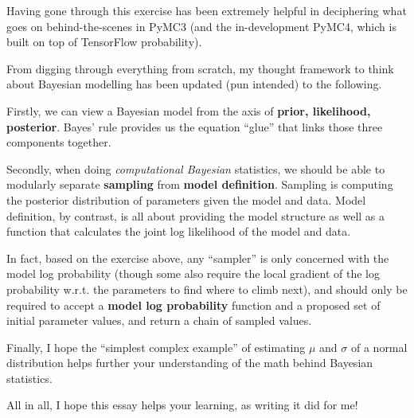 Having gone through this exercise has been extremely helpful in deciphering what goes on behind-the-scenes in PyMC3 (and the in-development PyMC4, which is built on top of TensorFlow probability).

From digging through everything from scratch, my thought framework to think about Bayesian modelling has been updated (pun intended) to the following.

Firstly, we can view a Bayesian model from the axis of \textbf{prior, likelihood, posterior}. Bayes' rule provides us the equation ``glue'' that links those three components together.

Secondly, when doing \emph{computational Bayesian} statistics, we should be able to modularly separate \textbf{sampling} from \textbf{model definition}. Sampling is computing the posterior distribution of parameters given the model and data. Model definition, by contrast, is all about providing the model structure as well as a function that calculates the joint log likelihood of the model and data.

In fact, based on the exercise above, any ``sampler'' is only concerned with the model log probability (though some also require the local gradient of the log probability w.r.t. the parameters to find where to climb next), and should only be required to accept a \textbf{model log probability} function and a proposed set of initial parameter values, and return a chain of sampled values.

Finally, I hope the ``simplest complex example'' of estimating $\mu$ and $\sigma$ of a normal distribution helps further your understanding of the math behind Bayesian statistics.

All in all, I hope this essay helps your learning, as writing it did for me! 